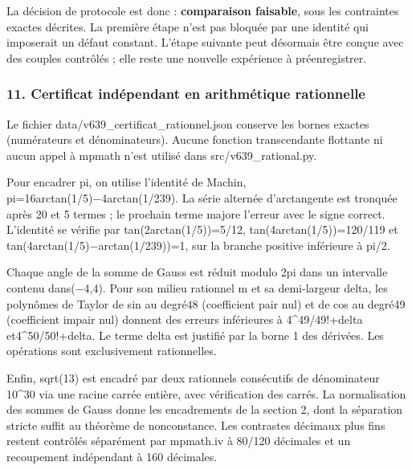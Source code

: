 \documentclass[
  10pt,
  a4paper,
]{article}
\begin{document}
La décision de protocole est donc : \textbf{comparaison faisable}, sous
les contraintes exactes décrites. La première étape n'est pas bloquée
par une identité qui imposerait un défaut constant. L'étape suivante
peut désormais être conçue avec des couples contrôlés ; elle reste une
nouvelle expérience à préenregistrer.

\hypertarget{certificat-induxe9pendant-en-arithmuxe9tique-rationnelle}{%
\subsubsection{11. Certificat indépendant en arithmétique
rationnelle}\label{certificat-induxe9pendant-en-arithmuxe9tique-rationnelle}}

Le fichier data/v639\_certificat\_rationnel.json conserve les bornes
exactes (numérateurs et dénominateurs). Aucune fonction transcendante
flottante ni aucun appel à mpmath n'est utilisé dans
src/v639\_rational.py.

Pour encadrer pi, on utilise l'identité de Machin,
pi=16arctan(1/5)−4arctan(1/239). La série alternée d'arctangente est
tronquée après 20 et 5 termes ; le prochain terme majore l'erreur avec
le signe correct. L'identité se vérifie par tan(2arctan(1/5))=5/12,
tan(4arctan(1/5))=120/119 et tan(4arctan(1/5)−arctan(1/239))=1, sur la
branche positive inférieure à pi/2.

Chaque angle de la somme de Gauss est réduit modulo 2pi dans un
intervalle contenu dans(−4,4). Pour son milieu rationnel m et sa
demi-largeur delta, les polynômes de Taylor de sin au degré48
(coefficient pair nul) et de cos au degré49 (coefficient impair nul)
donnent des erreurs inférieures à 4\^{}49/49!+delta et4\^{}50/50!+delta.
Le terme delta est justifié par la borne 1 des dérivées. Les opérations
sont exclusivement rationnelles.

Enfin, sqrt(13) est encadré par deux rationnels consécutifs de
dénominateur 10\^{}30 via une racine carrée entière, avec vérification
des carrés. La normalisation des sommes de Gauss donne les encadrements
de la section 2, dont la séparation stricte suffit au théorème de
nonconstance. Les contrastes décimaux plus fins restent contrôlés
séparément par mpmath.iv à 80/120 décimales et un recoupement
indépendant à 160 décimales.
\end{document}
